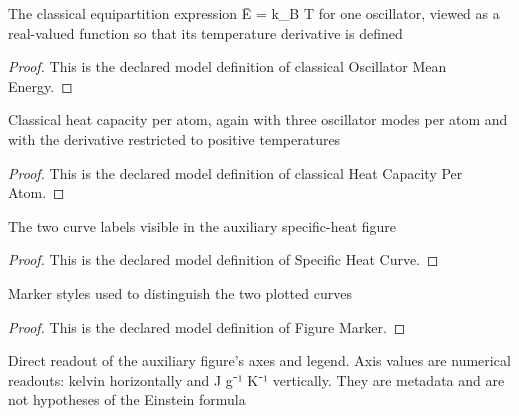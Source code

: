 \begin{definition}
  \label{def:physics:phyx-mini-0604:phyxmini0604-classicaloscillatormeanenergy}
  The classical equipartition expression Ē = k\_B T for one oscillator, viewed as a real-valued function so that its temperature derivative is defined
\end{definition}
\begin{proof}
  This is the declared model definition of classical Oscillator Mean Energy.
\end{proof}
\begin{definition}
  \label{def:physics:phyx-mini-0604:phyxmini0604-classicalheatcapacityperatom}
  Classical heat capacity per atom, again with three oscillator modes per atom and with the derivative restricted to positive temperatures
\end{definition}
\begin{proof}
  This is the declared model definition of classical Heat Capacity Per Atom.
\end{proof}
\begin{definition}
  \label{def:physics:phyx-mini-0604:phyxmini0604-specificheatcurve}
  The two curve labels visible in the auxiliary specific-heat figure
\end{definition}
\begin{proof}
  This is the declared model definition of Specific Heat Curve.
\end{proof}
\begin{definition}
  \label{def:physics:phyx-mini-0604:phyxmini0604-figuremarker}
  Marker styles used to distinguish the two plotted curves
\end{definition}
\begin{proof}
  This is the declared model definition of Figure Marker.
\end{proof}
\begin{definition}
  \label{def:physics:phyx-mini-0604:phyxmini0604-specificheatfigurereadout}
  Direct readout of the auxiliary figure's axes and legend. Axis values are numerical readouts: kelvin horizontally and J g⁻¹ K⁻¹ vertically. They are metadata and are not hypotheses of the Einstein formula
\end{definition}
